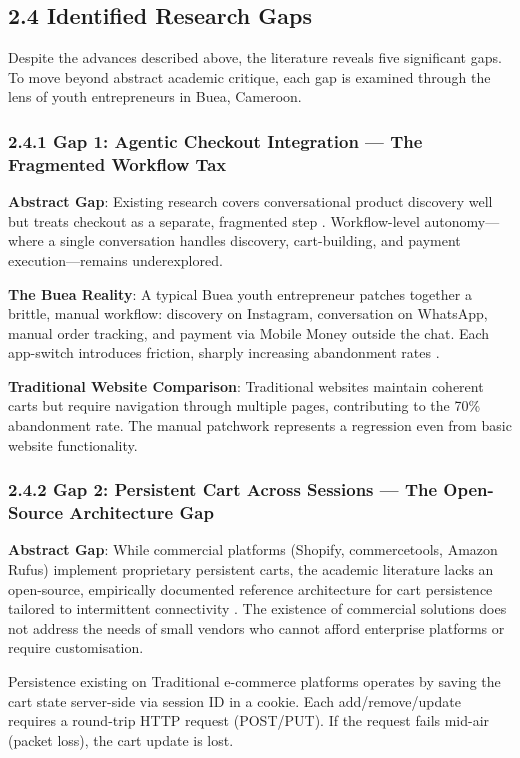 \documentclass[12pt,a4paper]{article}
\begin{document}
\subsection{2.4 Identified Research Gaps}

Despite the advances described above, the literature reveals five significant gaps. To move beyond abstract academic critique, each gap is examined through the lens of youth entrepreneurs in Buea, Cameroon.

\subsubsection{2.4.1 Gap 1: Agentic Checkout Integration --- The Fragmented Workflow Tax}

\textbf{Abstract Gap}: Existing research covers conversational product discovery well but treats checkout as a separate, fragmented step \citep{eugenio2026}. Workflow-level autonomy---where a single conversation handles discovery, cart-building, and payment execution---remains underexplored.

\textbf{The Buea Reality}: A typical Buea youth entrepreneur patches together a brittle, manual workflow: discovery on Instagram, conversation on WhatsApp, manual order tracking, and payment via Mobile Money outside the chat. Each app-switch introduces friction, sharply increasing abandonment rates \citep{saleh2022}.

\textbf{Traditional Website Comparison}: Traditional websites maintain coherent carts but require navigation through multiple pages, contributing to the 70\% abandonment rate. The manual patchwork represents a regression even from basic website functionality.

\subsubsection{2.4.2 Gap 2: Persistent Cart Across Sessions --- The Open-Source Architecture Gap}

\textbf{Abstract Gap}: While commercial platforms (Shopify, commercetools, Amazon Rufus) implement proprietary persistent carts, the academic literature lacks an open-source, empirically documented reference architecture for cart persistence tailored to intermittent connectivity \citep{sharma2025, hamedani2026}. The existence of commercial solutions does not address the needs of small vendors who cannot afford enterprise platforms or require customisation.

Persistence existing on Traditional e-commerce platforms operates by saving the cart state server-side via session ID in a cookie. Each add/remove/update requires a round-trip HTTP request (POST/PUT). If the request fails mid-air (packet loss), the cart update is lost.
\end{document}
